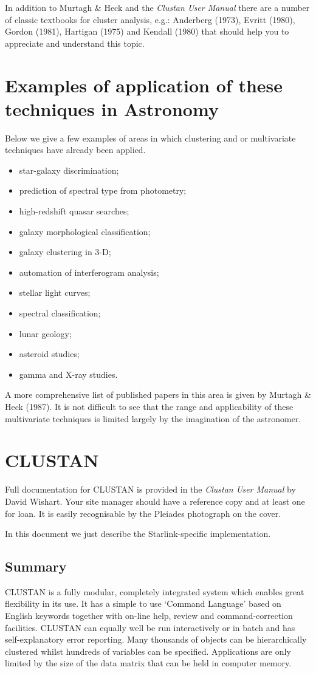 In addition to Murtagh \& Heck and the {\it Clustan User Manual}
there are a number of classic textbooks for cluster analysis, e.g.: Anderberg
(1973), Evritt (1980), Gordon (1981), Hartigan (1975) and Kendall (1980)
that should help you to appreciate and understand this topic.

\section{Examples of application of these techniques in Astronomy}

Below we give a few examples of areas in which clustering and\/ or multivariate
techniques have already been applied.

\begin{itemize}
\item star-galaxy discrimination;
\item prediction of spectral type from photometry;
\item high-redshift quasar searches;
\item galaxy morphological classification;
\item galaxy clustering in 3-D;
\item automation of interferogram analysis;
\item stellar light curves;
\item spectral classification;
\item lunar geology;
\item asteroid studies;
\item gamma and X-ray studies.
\end{itemize}

A more comprehensive list of published papers in this area is given by
Murtagh \& Heck (1987). It is not difficult to see that the range and
applicability of these multivariate techniques is limited largely by the
imagination of the astronomer. 

\section{CLUSTAN}
Full documentation for {\small CLUSTAN} is provided in the {\it Clustan
User Manual} by David Wishart.  Your site manager should have a
reference copy and at least one for loan.  It is easily recognisable by
the Pleiades photograph on the cover. 

In this document we just describe the Starlink-specific implementation.

\subsection{Summary}
{\small CLUSTAN} is a fully modular, completely integrated system which
enables great flexibility in its use. It has a simple to use `Command
Language' based on English keywords together with on-line help, review
and command-correction facilities. {\small CLUSTAN} can equally well be
run interactively or in batch and has self-explanatory error reporting.
Many thousands of objects can be hierarchically clustered whilst
hundreds of variables can be specified. Applications are only limited by
the size of the data matrix that can be held in computer memory. 

